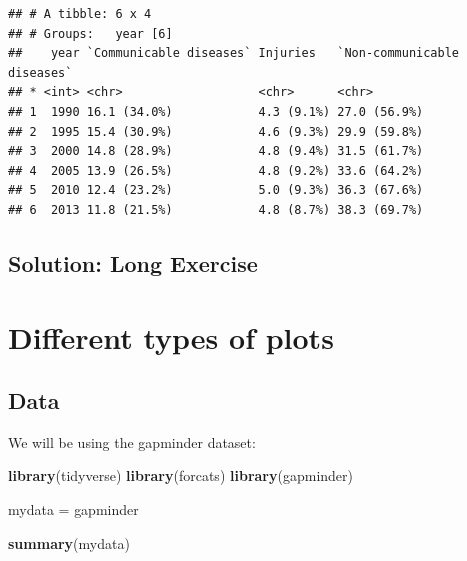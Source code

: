 \documentclass[]{book}
\makeatletter
\newenvironment{Shaded}{\begin{snugshade}}{\end{snugshade}}
\newcommand{\KeywordTok}[1]{\textcolor[rgb]{0.13,0.29,0.53}{\textbf{#1}}}
\newcommand{\DataTypeTok}[1]{\textcolor[rgb]{0.13,0.29,0.53}{#1}}
\newcommand{\DecValTok}[1]{\textcolor[rgb]{0.00,0.00,0.81}{#1}}
\newcommand{\StringTok}[1]{\textcolor[rgb]{0.31,0.60,0.02}{#1}}
\newcommand{\OperatorTok}[1]{\textcolor[rgb]{0.81,0.36,0.00}{\textbf{#1}}}
\newcommand{\NormalTok}[1]{#1}
\newenvironment{kframe}{%
\medskip{}
\setlength{\fboxsep}{.8em}
 \def\at@end@of@kframe{}%
 \ifinner\ifhmode%
  \def\at@end@of@kframe{\end{minipage}}%
  \begin{minipage}{\columnwidth}%
 \fi\fi%
 \def\FrameCommand##1{\hskip\@totalleftmargin \hskip-\fboxsep
 \colorbox{shadecolor}{##1}\hskip-\fboxsep
     \hskip-\linewidth \hskip-\@totalleftmargin \hskip\columnwidth}%
 \MakeFramed {\advance\hsize-\width
   \@totalleftmargin\z@ \linewidth\hsize
   \@setminipage}}%
 {\par\unskip\endMakeFramed%
 \at@end@of@kframe}
\renewenvironment{Shaded}{\begin{kframe}}{\end{kframe}}
\makeatother
\begin{document}
\begin{verbatim}
## # A tibble: 6 x 4
## # Groups:   year [6]
##    year `Communicable diseases` Injuries   `Non-communicable diseases`
## * <int> <chr>                   <chr>      <chr>                      
## 1  1990 16.1 (34.0%)            4.3 (9.1%) 27.0 (56.9%)               
## 2  1995 15.4 (30.9%)            4.6 (9.3%) 29.9 (59.8%)               
## 3  2000 14.8 (28.9%)            4.8 (9.4%) 31.5 (61.7%)               
## 4  2005 13.9 (26.5%)            4.8 (9.2%) 33.6 (64.2%)               
## 5  2010 12.4 (23.2%)            5.0 (9.3%) 36.3 (67.6%)               
## 6  2013 11.8 (21.5%)            4.8 (8.7%) 38.3 (69.7%)
\end{verbatim}

\section{Solution: Long Exercise}\label{solution-long-exercise}

\begin{Shaded}
\end{Shaded}

\chapter{Different types of plots}\label{different-types-of-plots}

\section{Data}\label{data-2}

We will be using the gapminder dataset:

\begin{Shaded}
\begin{Highlighting}[]
\KeywordTok{library}\NormalTok{(tidyverse)}
\KeywordTok{library}\NormalTok{(forcats)}
\KeywordTok{library}\NormalTok{(gapminder)}

\NormalTok{mydata =}\StringTok{ }\NormalTok{gapminder}

\KeywordTok{summary}\NormalTok{(mydata)}
\end{Highlighting}
\end{Shaded}
\end{document}
